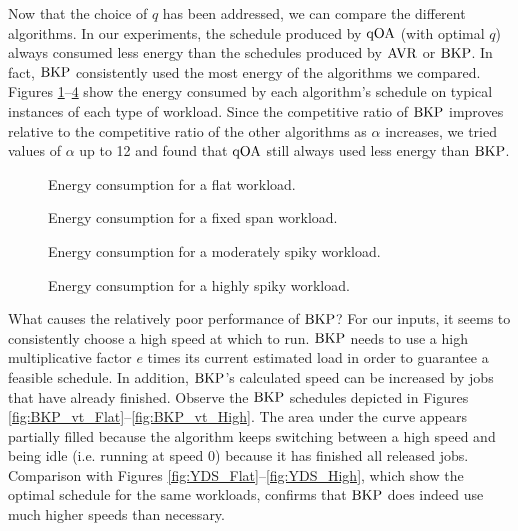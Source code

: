 \documentclass[11pt]{article}
\newcommand{\BKP}{{\rm BKP}}
\newcommand{\AVR}{{\rm AVR}}
\newcommand{\qOA}{{\rm qOA}}
\begin{document}
Now that the choice of $q$ has been addressed, we can compare
the different algorithms.
In our experiments, the schedule produced by $\qOA$ (with optimal $q$)
always consumed less energy than the schedules produced by 
$\AVR$ or $\BKP$.
In fact, $\BKP$ consistently used the most energy of the algorithms we
compared.
Figures \ref{fig:energy-flat}--\ref{fig:energy-high} show the energy
consumed by each algorithm's schedule on typical instances of each
type of workload.
Since the competitive ratio of $\BKP$ improves relative to the
competitive ratio of the other algorithms as $\alpha$ increases,
we tried values of $\alpha$ up to 12 and found
that $\qOA$ still always used less energy than $\BKP$.

\begin{figure}
\centering
{}
\caption{Energy consumption for a flat workload.}
\label{fig:energy-flat}
\end{figure}

\begin{figure}
\centering
{}
\caption{Energy consumption for a fixed span workload.}
\label{fig:energy-fixed}
\end{figure}

\begin{figure}
\centering
{}
\caption{Energy consumption for a moderately spiky workload.}
\label{fig:energy-moderate}
\end{figure}

\begin{figure}
\centering
{}
\caption{Energy consumption for a highly spiky workload.}
\label{fig:energy-high}
\end{figure}



What causes the relatively poor performance of $\BKP$?
For our inputs, it seems to consistently choose a high speed at
which to run. $\BKP$ needs to use a 
high multiplicative factor $e$ times its current estimated load in order to guarantee a feasible schedule.
In addition, $\BKP$'s calculated speed can be increased by
jobs that have already finished.
Observe the $\BKP$ schedules depicted in Figures \ref{fig:BKP_vt_Flat}--\ref{fig:BKP_vt_High}.
The area under the curve appears partially filled because the
algorithm keeps switching between a high speed and being idle
(i.e. running at speed 0) because it has finished all released jobs.
Comparison with Figures \ref{fig:YDS_Flat}--\ref{fig:YDS_High}, which
show the optimal schedule for the same workloads, confirms that $\BKP$
does indeed use much higher speeds than necessary.
\end{document}
